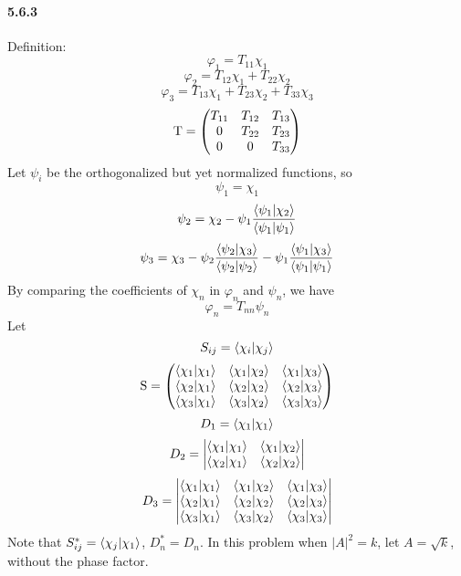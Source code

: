 \documentclass[a4paper]{article}
\begin{document}
\paragraph{5.6.3}
Definition:
\[
\varphi_1=T_{11}\chi_1
\]
\[
\varphi_2=T_{12}\chi_1+T_{22}\chi_2
\]
\[
\varphi_3=T_{13}\chi_1+T_{23}\chi_2+T_{33}\chi_3
\]
\[
\mathrm{T}=
\begin{pmatrix}
T_{11}&T_{12}&T_{13}\\
0&T_{22}&T_{23}\\
0&0&T_{33}
\end{pmatrix}
\]
Let $\psi_i$ be the orthogonalized but yet normalized functions, so
\[
\psi_1=\chi_1
\]
\[
\psi_2=\chi_2-\psi_1\frac{\langle\psi_1|\chi_2\rangle}{\langle\psi_1|\psi_1\rangle}
\]
\[
\psi_3=\chi_3-\psi_2\frac{\langle\psi_2|\chi_3\rangle}{\langle\psi_2|\psi_2\rangle}-\psi_1\frac{\langle\psi_1|\chi_3\rangle}{\langle\psi_1|\psi_1\rangle}
\]
By comparing the coefficients of $\chi_n$ in $\varphi_n$ and $\psi_n$, we have
\[
\varphi_n=T_{nn}\psi_n
\]
Let
\[
S_{ij}=\langle\chi_i|\chi_j\rangle
\]
\[
\mathrm{S}=
\begin{pmatrix}
\langle\chi_1|\chi_1\rangle&\langle\chi_1|\chi_2\rangle&\langle\chi_1|\chi_3\rangle\\
\langle\chi_2|\chi_1\rangle&\langle\chi_2|\chi_2\rangle&\langle\chi_2|\chi_3\rangle\\
\langle\chi_3|\chi_1\rangle&\langle\chi_3|\chi_2\rangle&\langle\chi_3|\chi_3\rangle\\
\end{pmatrix}
\]
\[
D_1=\langle\chi_1|\chi_1\rangle
\]
\[
D_2=
\begin{vmatrix}
\langle\chi_1|\chi_1\rangle&\langle\chi_1|\chi_2\rangle\\
\langle\chi_2|\chi_1\rangle&\langle\chi_2|\chi_2\rangle\\
\end{vmatrix}
\]
\[
D_3=
\begin{vmatrix}
\langle\chi_1|\chi_1\rangle&\langle\chi_1|\chi_2\rangle&\langle\chi_1|\chi_3\rangle\\
\langle\chi_2|\chi_1\rangle&\langle\chi_2|\chi_2\rangle&\langle\chi_2|\chi_3\rangle\\
\langle\chi_3|\chi_1\rangle&\langle\chi_3|\chi_2\rangle&\langle\chi_3|\chi_3\rangle\\
\end{vmatrix}
\]
Note that $S_{ij}^*=\langle\chi_j|\chi_1\rangle$, $D_n^*=D_n$. In this problem when $|A|^2=k$, let $A=\sqrt{k}$, without the phase factor.
\medskip
\end{document}
